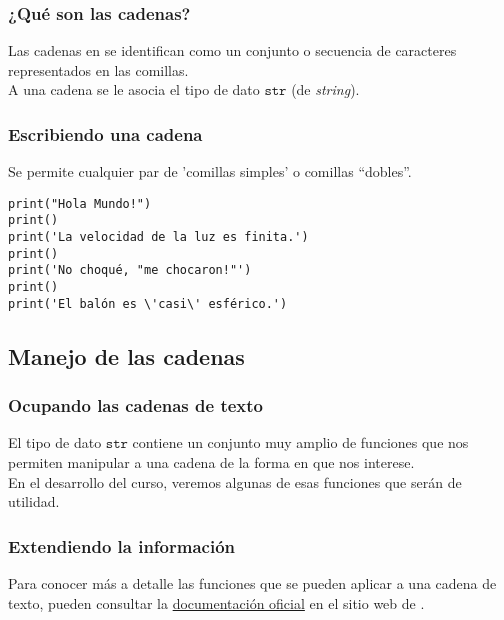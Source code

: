 \documentclass[12pt]{beamer}
\begin{document}
\begin{frame}
\frametitle{¿Qué son las cadenas?}
Las cadenas en \python{} se identifican como un conjunto o secuencia de caracteres representados en las comillas.
\\
\bigskip
\pause
A una cadena se le asocia el tipo de dato $\texttt{str}$ (de \emph{string}).
\end{frame}
\begin{frame}[fragile]
\frametitle{Escribiendo una cadena}
Se permite cualquier par de 'comillas simples' o comillas \enquote{dobles}.
\pause
\begin{lstlisting}[caption=Escribiendo cadenas de texto]
print("Hola Mundo!")
print()
print('La velocidad de la luz es finita.')
print()
print('No choqué, "me chocaron!"')
print()
print('El balón es \'casi\' esférico.')
\end{lstlisting}
\end{frame}

\subsection{Manejo de las cadenas}

\begin{frame}
\frametitle{Ocupando las cadenas de texto}
El tipo de dato $\texttt{str}$ contiene un conjunto muy amplio de funciones que nos permiten manipular a una cadena de la forma en que nos interese.
\\
\bigskip
\pause
En el desarrollo del curso, veremos algunas de esas funciones que serán de utilidad.
\end{frame}
\begin{frame}
\frametitle{Extendiendo la información}
Para conocer más a detalle las funciones que se pueden aplicar a una cadena de texto, pueden consultar la \href{https://docs.python.org/es/3/library/string.html}{documentación oficial} en el sitio web de \python.
\end{frame}
\end{document}
